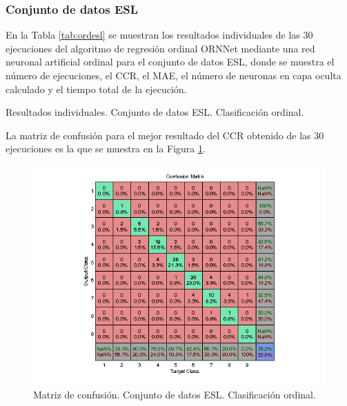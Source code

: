 			\subsubsection{Conjunto de datos ESL}
			
			En la Tabla \ref{tab:ordesl} se muestran los resultados individuales de las 30 ejecuciones del algoritmo de regresión ordinal ORNNet mediante una red neuronal artificial ordinal para el conjunto de datos ESL, donde se muestra el número de ejecuciones, el CCR, el MAE, el número de neuronas en capa oculta calculado y el tiempo total de la ejecución.\\
			
			\begin{table}[!htbp]
				\centering
				\caption{Resultados individuales. Conjunto de datos ESL. Clasificación ordinal.}
				\label{tab:ordesl}
			\end{table}
			
			La matriz de confusión para el mejor resultado del CCR obtenido de las 30 ejecuciones es la que se muestra en la Figura \ref{fig:ordesl}.
			
			\begin{figure}[htbp]
				\centering
				\includegraphics[scale=0.8]{../src/results/ordinal/ESL_mc1.png}
				\caption{Matriz de confusión. Conjunto de datos ESL. Clasificación ordinal.}
				\label{fig:ordesl}
			\end{figure}
			
